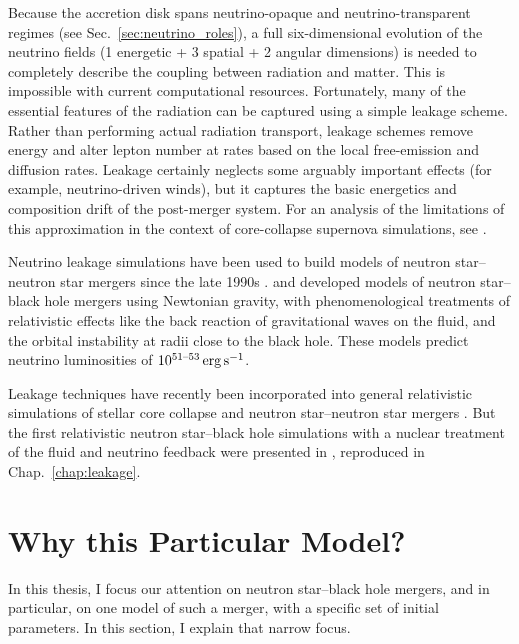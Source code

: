 Because the accretion disk spans neutrino-opaque and neutrino-transparent regimes
(see Sec.~\ref{sec:neutrino_roles}), a full six-dimensional evolution of the
neutrino fields (1 energetic + 3 spatial + 2 angular dimensions) is needed
to completely describe the coupling between radiation and matter.
This is impossible with current computational resources. Fortunately, many of
the essential features of the radiation can be captured using a simple
leakage scheme. Rather than performing actual radiation transport, leakage
schemes remove energy and alter lepton number at rates based on the local
free-emission and diffusion rates. Leakage certainly neglects some arguably
important effects (for example, neutrino-driven winds), but it captures
the basic energetics and composition drift of the post-merger system.
For an analysis of the limitations of this approximation in the context of
core-collapse supernova simulations, see \citet{ott2013-cc_leakage}.

Neutrino leakage simulations have been used to build models of neutron
star--neutron star \nsns mergers since the late 1990s
\citep{
ruff1996-leakage_part1,
ross2002-leakage_part1}.
\citet{jank1999-leakage_bhns} and \citet{ross2004-leakage_bhns} developed models
of neutron star--black hole \nsbh mergers using Newtonian gravity, with
phenomenological treatments of relativistic effects like the back reaction of
gravitational waves on the fluid, and the orbital instability at radii close to
the black hole.
These models predict neutrino luminosities of $10^{51\text{--}53}\rm\,erg\,s^{-1}$.

Leakage techniques have recently been incorporated into general relativistic
simulations of stellar core collapse
\citep{seki2011-cc_leakage, ott2013-cc_leakage}
and neutron star--neutron star \nsns mergers
\citep{seki2011-nsns_leakage,kiuc2012-nsns_leakage_hyperons}.
But the first relativistic neutron star--black hole simulations with a
nuclear treatment of the fluid and neutrino feedback were presented in
\cite{deat2013-leakage}, reproduced in Chap.~\ref{chap:leakage}.

\section{Why this Particular Model?}
\label{sec:why_this_model}
In this thesis, I focus our attention on neutron star--black hole mergers, and in
particular, on one model of such a merger, with a specific set of initial
parameters. In this section, I explain that narrow focus.

